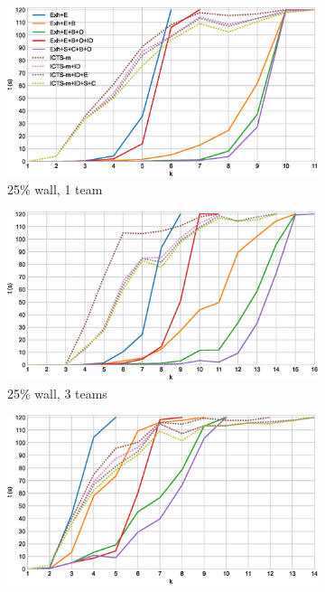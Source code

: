 \documentclass[english]{article}
\newcommand\graphwidth{0.49\textwidth}
\begin{document}
	\printbibliography
	\newpage
	\begin{figure}[t]
		\centering
		\begin{subfigure}{\graphwidth}
			\centering
			\includegraphics[width=\linewidth]{img/results/icts-comparison/25-1}
			\caption{25\% wall, 1 team}
			\label{fig:i-25-1}
		\end{subfigure}
		\begin{subfigure}{\graphwidth}
			\centering
			\includegraphics[width=\linewidth]{img/results/icts-comparison/25-3}
			\caption{25\% wall, 3 teams}
			\label{fig:i-25-3}
		\end{subfigure}
		\begin{subfigure}{\graphwidth}
			\centering
			\includegraphics[width=\linewidth]{img/results/icts-comparison/75-1}

\end{subfigure}
\end{figure}
\end{document}
